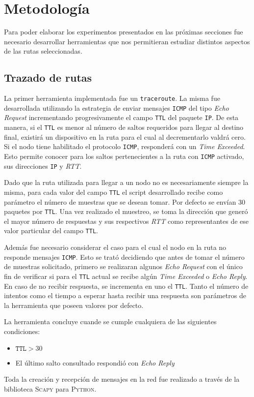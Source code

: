 \section{Metodología}

Para poder elaborar los experimentos presentados en las próximas secciones fue
necesario desarrollar herramientas que nos permitieran estudiar distintos
aspectos de las rutas seleccionadas.

\subsection{Trazado de rutas}

La primer herramienta implementada fue un \texttt{traceroute}. La misma fue
desarrollada utilizando la estrategia de enviar mensajes \texttt{ICMP} del tipo
\emph{Echo Request} incrementando progresivamente el campo \texttt{TTL}
del paquete \texttt{IP}. De esta manera, si el \texttt{TTL} es menor al número
de saltos requeridos para llegar al destino final, existirá un dispositivo en la
ruta para el cual al decrementarlo valdrá cero. Si el nodo tiene habilitado
el protocolo \texttt{ICMP}, responderá con un \emph{Time Exceeded}. Esto permite
conocer para los saltos pertenecientes a la ruta con \texttt{ICMP} activado, sus
direcciones \texttt{IP} y \emph{RTT}.

Dado que la ruta utilizada para llegar a un nodo no es necesariamente
siempre la misma, para cada valor del campo \texttt{TTL} el script desarrollado
recibe como parámetro el número de muestras que se desean tomar. Por defecto se
envían 30 paquetes por \texttt{TTL}. Una vez realizado el muestreo, se toma la
dirección que generó el mayor número de respuestas y sus respectivos \emph{RTT}
como representantes de ese valor particular del campo \texttt{TTL}.

Además fue necesario considerar el caso para el cual el nodo en la ruta no
responde mensajes \texttt{ICMP}. Esto se trató decidiendo que antes de tomar
el número de muestras solicitado, primero se realizaran algunos \emph{Echo
Request} con el único fin de verificar si para el \texttt{TTL} actual se recibe algún
\emph{Time Exceeded} o \emph{Echo Reply}. En caso de no recibir respuesta, se
incrementa en uno el \texttt{TTL}. Tanto el número de intentos como el tiempo a
esperar hasta recibir una respuesta son parámetros de la herramienta que poseen
valores por defecto.

La herramienta concluye cuande se cumple cualquiera de las siguientes
condiciones:

\begin{itemize}
    \item $\texttt{TTL} > 30$
    \item El último salto consultado respondió con \emph{Echo Reply}
\end{itemize}

Toda la creación y recepción de mensajes en la red fue realizado a través de la
biblioteca \textsc{Scapy} para \textsc{Python}.
